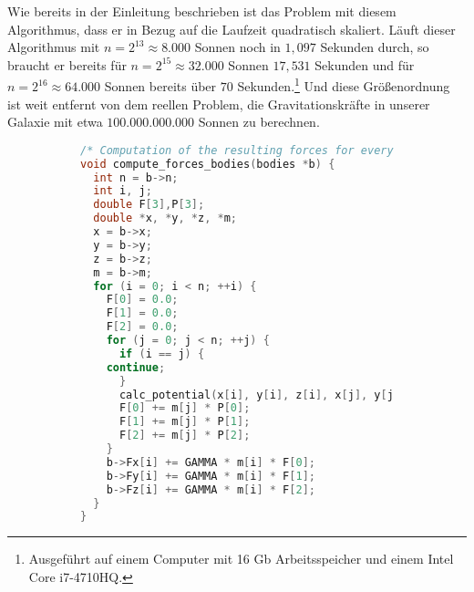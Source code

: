     Wie bereits in der Einleitung beschrieben ist das Problem mit diesem Algorithmus, dass er in Bezug auf die Laufzeit quadratisch skaliert. Läuft dieser Algorithmus mit $n = 2^{13} \approx 8.000$
    Sonnen noch in $1,097$ Sekunden durch, so braucht er bereits für $n = 2^{15} \approx 32.000$ Sonnen $17,531$ Sekunden und für $n = 2^{16} \approx 64.000$ Sonnen bereits über $70$ 
    Sekunden.\footnote{Ausgeführt auf einem Computer mit 16 Gb Arbeitsspeicher und einem Intel Core i7-4710HQ.} 
    Und diese Größenordnung ist weit entfernt von dem reellen Problem, die Gravitationskräfte in unserer Galaxie mit etwa $100.000.000.000$ Sonnen zu berechnen.
    
    \begin{figure}[b]
    \centering
    \begin{subfigure}{0.9\textwidth}
    \begin{lstlisting}[language=C, label=lst:compfbodies,caption={Diese Methode berechnet die auftretenden Gravitationskräfte.}]
/* Computation of the resulting forces for every particle.*/
void compute_forces_bodies(bodies *b) {
  int n = b->n;
  int i, j;
  double F[3],P[3];
  double *x, *y, *z, *m;
  x = b->x;
  y = b->y;
  z = b->z;
  m = b->m;
  for (i = 0; i < n; ++i) {
    F[0] = 0.0;
    F[1] = 0.0;
    F[2] = 0.0;
    for (j = 0; j < n; ++j) {
      if (i == j) {
	continue;
      }
      calc_potential(x[i], y[i], z[i], x[j], y[j], z[j], P);
      F[0] += m[j] * P[0];
      F[1] += m[j] * P[1];
      F[2] += m[j] * P[2];
    }
    b->Fx[i] += GAMMA * m[i] * F[0];
    b->Fy[i] += GAMMA * m[i] * F[1];
    b->Fz[i] += GAMMA * m[i] * F[2];
  }
}
    \end{lstlisting}
    \end{subfigure}
    \end{figure}
    
    \clearpage
    
